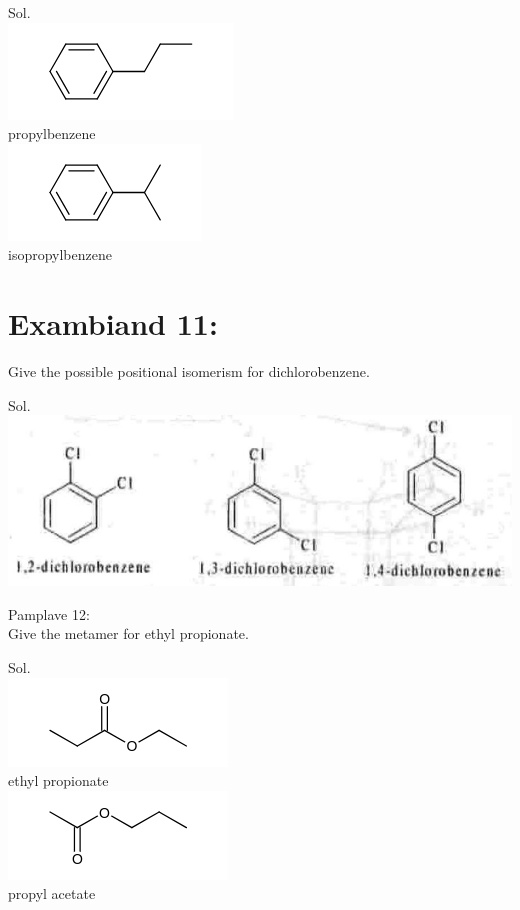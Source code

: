 \documentclass[10pt]{article}
\begin{document}
Sol.\\
\includegraphics{smile-8eb284ba501208706d259b111ce98f0497caf5c8}\\
propylbenzene\\
\includegraphics{smile-871ddbf2295df21e98570b46123accf44ec2557d}\\
isopropylbenzene

\section*{Exambiand 11:}
Give the possible positional isomerism for dichlorobenzene.

Sol.\\
\includegraphics[max width=\textwidth, center]{2025_01_28_8470952b98110cec3aabg-062}

Pamplave 12:\\
Give the metamer for ethyl propionate.

Sol.\\
\includegraphics{smile-494a0d366e062912ff648b7089ca6143b48f2795}\\
ethyl propionate\\
\includegraphics{smile-f614f3cccea53928f1a4033f82f0b4abde2ebe41}\\
propyl acetate
\end{document}
